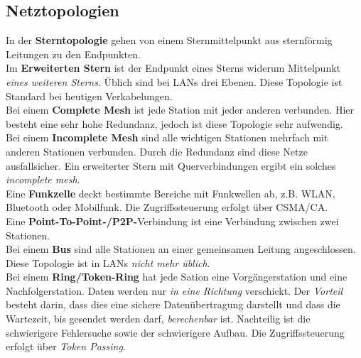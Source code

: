 \documentclass[a4paper, 12pt]{report}
\begin{document}

\newpage
\subsection{Netztopologien}

In der \textbf{Sterntopologie} gehen von einem Sternmittelpunkt aus sternförmig
Leitungen zu den Endpunkten. \\

Im \textbf{Erweiterten Stern} ist der Endpunkt eines Sterns widerum Mittelpunkt
\emph{eines weiteren Sterns}. Üblich sind bei LANs drei Ebenen. Diese Topologie
ist Standard bei heutigen Verkabelungen. \\

Bei einem \textbf{Complete Mesh} ist jede Station mit jeder anderen verbunden.
Hier besteht eine sehr hohe Redundanz, jedoch ist diese Topologie sehr
aufwendig. \\

Bei einem \textbf{Incomplete Mesh} sind alle wichtigen Stationen mehrfach mit
anderen Stationen verbunden. Durch die Redundanz sind diese Netze ausfallsicher.
Ein erweiterter Stern mit Querverbindungen ergibt ein solches \emph{incomplete
mesh}. \\

Eine \textbf{Funkzelle} deckt bestimmte Bereiche  mit Funkwellen ab, z.B.
WLAN, Bluetooth oder Mobilfunk. Die Zugriffssteuerung erfolgt über CSMA/CA. \\

Eine \textbf{Point-To-Point-/P2P-}Verbindung ist eine Verbindung zwischen zwei
Stationen. \\

Bei einem \textbf{Bus} sind alle Stationen an einer gemeinsamen Leitung
angeschlossen. Diese Topologie ist in LANs \emph{nicht mehr üblich}. \\

Bei einem \textbf{Ring/Token-Ring} hat jede Sation eine Vorgängerstation und
eine Nachfolgerstation. Daten werden nur \emph{in eine Richtung} verschickt.
Der \emph{Vorteil} besteht darin, dass dies eine sichere Datenübertragung
darstellt und dass die Wartezeit, bis gesendet werden darf, \emph{berechenbar}
ist. Nachteilig ist die schwierigere Fehlersuche sowie der schwierigere Aufbau.
Die Zugriffssteuerung erfolgt über \emph{Token Passing}. \\
\end{document}

